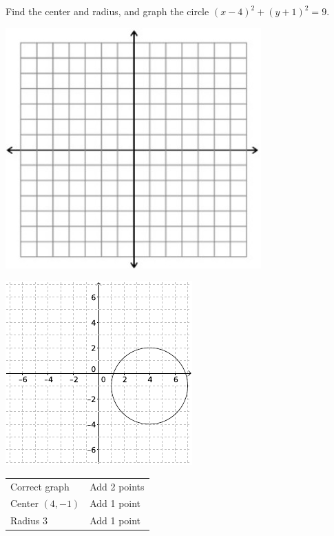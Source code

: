 {
	Find the center and radius, and graph the circle $(x-4)^2+(y+1)^2=9$.\begin{onlyproblem}\begin{center}\includegraphics{fig-graphpaper.png}\end{center}\end{onlyproblem} \begin{onlysolution}\begin{center}\includegraphics{fig100-20-b-answer}\end{center}\end{onlysolution}
}
{
	\begin{tabular}{l l}
	Correct graph & Add 2 points\\
	Center $(4, -1)$ & Add 1 point\\
	Radius $3$ & Add 1 point
	\end{tabular}
}

